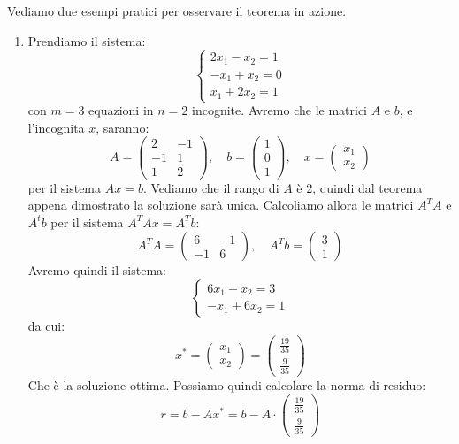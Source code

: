 \documentclass[a4paper,11pt]{article}
\begin{document}
Vediamo due esempi pratici per osservare il teorema in azione.
\begin{enumerate}
	\item Prendiamo il sistema:
\[
	\begin{cases}
		2x_1 - x_2 = 1 \\ 
		-x_1 + x_2 = 0 \\ 
		x_1 + 2 x_2 = 1
	\end{cases}
\]
con $m = 3$ equazioni in $n = 2$ incognite.
Avremo che le matrici $A$ e $b$, e l'incognita $x$, saranno:
$$
A = 
\begin{pmatrix}
	2 & -1 \\
	-1 & 1 \\ 
	1 & 2
\end{pmatrix}, \quad
b =
\begin{pmatrix}
	1 \\ 
	0 \\ 
	1
\end{pmatrix}, \quad
x = 
\begin{pmatrix}
	x_1 \\ 
	x_2
\end{pmatrix}
$$
per il sistema $Ax = b$.
Vediamo che il rango di $A$ è 2, quindi dal teorema appena dimostrato la soluzione sarà unica. 
Calcoliamo allora le matrici $A^T A$ e $A^t b$ per il sistema $A^T A x = A^T b$:
$$
A^T A = 
\begin{pmatrix}
	6 & -1 \\ 
	-1 & 6
\end{pmatrix}, \quad
A^T b =
\begin{pmatrix}
	3 \\ 
	1
\end{pmatrix}
$$
Avremo quindi il sistema:
\[
	\begin{cases}
		6 x_1 - x_2 = 3 \\
		-x_1 + 6 x_2 = 1
	\end{cases}
\]
da cui:
$$
x^* =
\begin{pmatrix}
	x_1 \\ x_2
\end{pmatrix}
=
\begin{pmatrix}
	\frac{19}{35} \\ \frac{9}{35}
\end{pmatrix}
$$
Che è la soluzione ottima.
Possiamo quindi calcolare la norma di residuo:
$$
r = b - A x^* = b - A \cdot
\begin{pmatrix}
	\frac{19}{35} \\ 
	\frac{9}{35}
\end{pmatrix}
$$
\end{enumerate}
\end{document}
